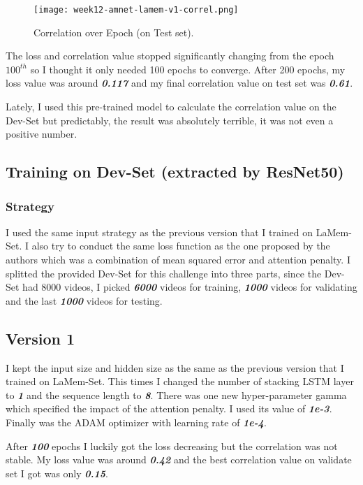 \begin{figure}[!ht]
\centering
\texttt{[image: week12-amnet-lamem-v1-correl.png]}
\caption{Correlation over Epoch (on Test set).}
\end{figure}

The loss and correlation value stopped significantly changing from the epoch $100^{th}$ so I thought it only needed 100 epochs to converge. After 200 epochs, my loss value was around \textbf{\emph{0.117}} and my final correlation value on test set was \textbf{\emph{0.61}}.

Lately, I used this pre-trained model to calculate the correlation value on the Dev-Set but predictably, the result was absolutely terrible, it was not even a positive number.

\subsection{Training on Dev-Set (extracted by ResNet50)}
\subsubsection{Strategy}
I used the same input strategy as the previous version that I trained on LaMem-Set. I also try to conduct the same loss function as the one proposed by the authors which was a combination of mean squared error and attention penalty. I splitted the provided Dev-Set for this challenge into three parts, since the Dev-Set had 8000 videos, I picked \textbf{\emph{6000}} videos for training, \textbf{\emph{1000}} videos for validating and the last \textbf{\emph{1000}} videos for testing.

\subsection{Version 1}
I kept the input size and hidden size as the same as the previous version that I trained on LaMem-Set. This times I changed the number of stacking LSTM layer to \textbf{\emph{1}} and the sequence length to \textbf{\emph{8}}. There was one new hyper-parameter gamma which specified the impact of the attention penalty. I used its value of \textbf{\emph{1e-3}}. Finally was the ADAM optimizer with learning rate of \textbf{\emph{1e-4}}.

After \textbf{\emph{100}} epochs I luckily got the loss decreasing but the correlation was not stable. My loss value was around \textbf{\emph{0.42}} and the best correlation value on validate set I got was only \textbf{\emph{0.15}}.

